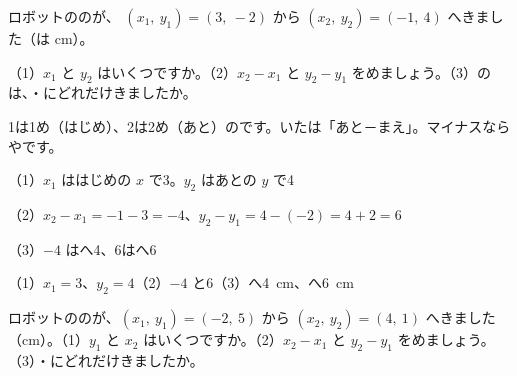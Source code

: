 \begin{reidai}[\R{下}{した}つき\R{文字}{も|じ}と、\R{動}{うご}いた\R{量}{りょう}]
ロボットののが、 $(x_1,\ y_1)=(3,\ -2)$ から $(x_2,\ y_2)=(-1,\ 4)$ へきました（は cm）。\par
（1）$x_1$ と $y_2$ はいくつですか。（2）$x_2-x_1$ と $y_2-y_1$ をめましょう。（3）のは、・にどれだけきましたか。\par
\kangaekata 1は1め（はじめ）、2は2め（あと）のです。いたは「あと－まえ」。マイナスならやです。\par
\shiki（1）\nobreak $x_1$ ははじめの $x$ で3。$y_2$ はあとの $y$ で4\par
\hspace*{2.6\zw}（2）\nobreak $x_2-x_1=-1-3=-4$、$y_2-y_1=4-(-2)=4+2=6$\par
\hspace*{2.6\zw}（3）\nobreak $-4$ はへ4、6はへ6\par
\kotae（1）\nobreak $x_1=3$、$y_2=4$\quad（2）\nobreak $-4$ と6\quad（3）\nobreak {}へ\qty{4}{cm}、へ\qty{6}{cm}
\end{reidai}

\begin{jibun}
ロボットののが、$(x_1,\ y_1)=(-2,\ 5)$ から $(x_2,\ y_2)=(4,\ 1)$ へきました（cm）。（1）$y_1$ と $x_2$ はいくつですか。（2）$x_2-x_1$ と $y_2-y_1$ をめましょう。（3）・にどれだけきましたか。
\end{jibun}

